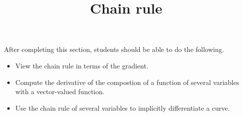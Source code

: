 \documentclass{ximera}
\title{Chain rule}
\begin{document}
\begin{abstract}
\end{abstract}

\maketitle

\begin{sectionOutcomes}

After completing this section, students should be able to do the following.

\begin{itemize}
\item View the chain rule in terms of the gradient.
\item Compute the derivative of the compostion of a function of
  several variables with a vector-valued function.
\item Use the chain rule of several variables to implicitly
  differentiate a curve.
\end{itemize}

\end{sectionOutcomes}
\end{document}
